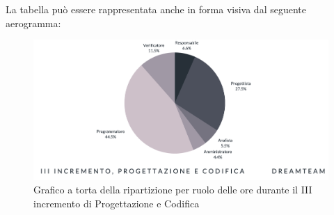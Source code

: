 La tabella può essere rappresentata anche in forma visiva dal seguente aerogramma:
\begin{figure}[H]
\centering
\includegraphics[scale=0.50]{Sezioni/SezioniPreventivo/grafici/progettazione/Progettazione_III_incremento_costi.png}
\caption{Grafico a torta della ripartizione per ruolo delle ore durante il III incremento di Progettazione e Codifica}
\end{figure}

\pagebreak


